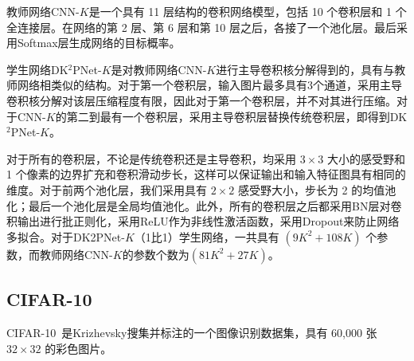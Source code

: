 教师网络CNN-$K$是一个具有 11 层结构的卷积网络模型，包括 10 个卷积层和 1 个全连接层。在网络的第 2 层、第 6 层和第 10 层之后，各接了一个池化层。最后采用Softmax层生成网络的目标概率。

学生网络DK$^2$PNet-$K$是对教师网络CNN-$K$进行主导卷积核分解得到的，具有与教师网络相类似的结构。对于第一个卷积层，输入图片最多具有3个通道，采用主导卷积核分解对该层压缩程度有限，因此对于第一个卷积层，并不对其进行压缩。对于CNN-$K$的第二到最有一个卷积层，采用主导卷积层替换传统卷积层，即得到DK$^2$PNet-$K$。

对于所有的卷积层，不论是传统卷积还是主导卷积，均采用 $3\times3$ 大小的感受野和 1 个像素的边界扩充和卷积滑动步长，这样可以保证输出和输入特征图具有相同的维度。对于前两个池化层，我们采用具有 $2\times2$ 感受野大小，步长为 2 的均值池化；最后一个池化层是全局均值池化。此外，所有的卷积层之后都采用BN层对卷积输出进行批正则化，采用ReLU作为非线性激活函数，采用Dropout来防止网络多拟合。对于DK2PNet-$K$（1比1）学生网络，一共具有 $(9K^2+108K)$ 个参数，而教师网络CNN-$K$的参数个数为$(81K^2+27K)$。


\subsection{CIFAR-10}
\label{sec:acc:experiment:cifar10}

CIFAR-10~\cite{krizhevsky2009learning}是Krizhevsky搜集并标注的一个图像识别数据集，具有 60,000 张 $32\times32$ 的彩色图片。

